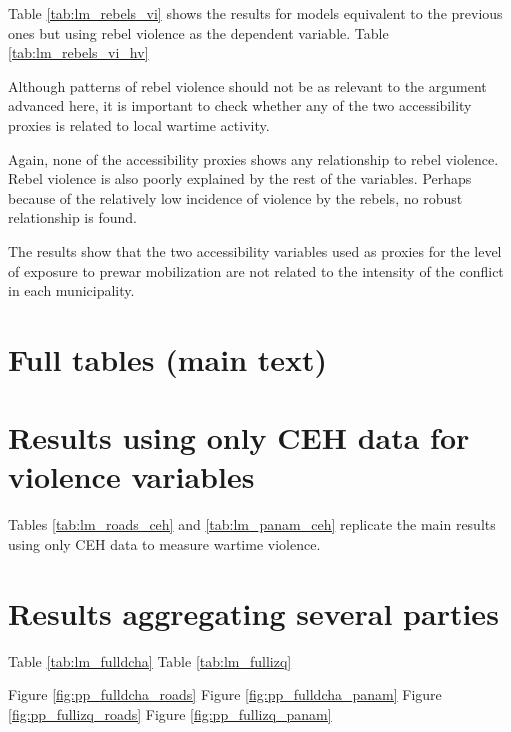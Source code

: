 \documentclass[a4paper, 12pt, notitlepage]{article}
\begin{document}
Table \ref{tab:lm_rebels_vi} shows the results for models equivalent to the previous ones but using rebel violence as the dependent variable.
Table \ref{tab:lm_rebels_vi_hv}


Although patterns of rebel violence should not be as relevant to the argument advanced here, it is important to check whether any of the two accessibility proxies is related to local wartime activity.

Again, none of the accessibility proxies shows any relationship to rebel violence.
Rebel violence is also poorly explained by the rest of the variables.
Perhaps because of the relatively low incidence of violence by the rebels, no robust relationship is found.

The results show that the two accessibility variables used as proxies for the level of exposure to prewar mobilization are not related to the intensity of the conflict in each municipality.






\clearpage
\section{Full tables (main text)}\label{app:results_tablong}







\clearpage
\section{Results using only CEH data for violence variables}\label{app:results_ceh}

Tables \ref{tab:lm_roads_ceh} and \ref{tab:lm_panam_ceh} replicate the main results using only CEH data to measure wartime violence.




\clearpage
\section{Results aggregating several parties}\label{app:results_full}

Table \ref{tab:lm_fulldcha}
Table \ref{tab:lm_fullizq}

Figure \ref{fig:pp_fulldcha_roads}
Figure \ref{fig:pp_fulldcha_panam}
Figure \ref{fig:pp_fullizq_roads}
Figure \ref{fig:pp_fullizq_panam}
\end{document}
